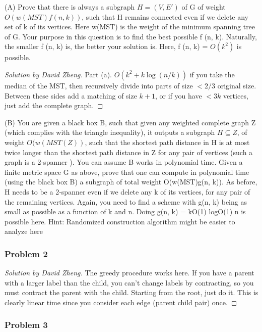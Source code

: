 \documentclass{article}
\newenvironment{solution}[1]{\begin{proof}[Solution by #1]}{\end{proof}}
\begin{document}
(A) Prove that there is always a subgraph $H = (V, E')$ of G of weight $O(w(MST)f (n, k))$,
such that H remains connected even if we delete any set of k of its vertices. Here w(MST)
is the weight of the minimum spanning tree of G. Your purpose in this question is to
find the best possible f (n, k). Naturally, the smaller f (n, k) is, the better your solution
is. Here, f (n, k) = $O(k^2)$ is possible.
\begin{solution}{David Zheng}
Part (a). $O(k^2 + k \log(n/k))$ if you take the median of the MST, then recursively divide into parts of size $< 2/3$ original size. Between these sides add a matching of size $k+1$, or if you have $<3k$ vertices, just add the complete graph. 
\end{solution}

(B) You are given a black box B, such that given any weighted complete graph Z (which
complies with the triangle inequality), it outputs a subgraph $H \subseteq Z$, of weight $O(w(MST(Z))$,
such that the shortest path distance in H is at most twice longer than the shortest path
distance in Z for any pair of vertices (such a graph is a 2-spanner ). You can assume B
works in polynomial time.
Given a finite metric space G as above, prove that one can compute in polynomial
time (using the black box B) a subgraph of total weight O(w(MST)g(n, k)). As before,
H needs to be a 2-spanner even if we delete any k of its vertices, for any pair of the
remaining vertices.
Again, you need to find a scheme with g(n, k) being as small as possible as a function
of k and n. Doing g(n, k) = kO(1) logO(1) n is possible here.
Hint: Randomized construction algorithm might be easier to analyze here

\subsubsection{Problem 2}
\begin{solution}{David Zheng}
The greedy procedure works here. If you have a parent with a larger label than the child, you can't change labels by contracting, so you must contract the parent with the child. Starting from the root, just do it. This is clearly linear time since you consider each edge (parent child pair) once.
\end{solution}

\subsubsection{Problem 3}
\end{document}
